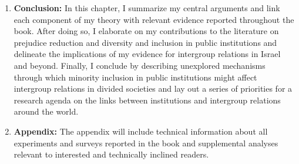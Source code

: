 \documentclass[12pt]{article}
\theoremstyle{plain}
\begin{document}
\begin{enumerate}
\item \textbf{Conclusion:} In this chapter, I summarize my central arguments and link each component of my theory with relevant evidence reported throughout the book. After doing so, I elaborate on my contributions to the literature on prejudice reduction and diversity and inclusion in public institutions and delineate the implications of my evidence for intergroup relations in Israel and beyond. Finally, I conclude by describing unexplored mechanisms through which minority inclusion in public institutions might affect intergroup relations in divided societies and lay out a series of priorities for a research agenda on the links between institutions and intergroup relations around the world.

\item \textbf{Appendix:} The appendix will include technical information about all experiments and surveys reported in the book and supplemental analyses relevant to interested and technically inclined readers.  

\end{enumerate}


\clearpage



\begin{singlespace}
 
%

\end{singlespace}
\end{document}

